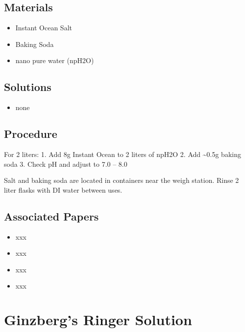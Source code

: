 \documentclass[
  letterpaper,
  DIV=11,
  numbers=noendperiod]{scrreprt}
\providecommand{\tightlist}{%
  \setlength{\itemsep}{0pt}\setlength{\parskip}{0pt}}\usepackage{longtable,booktabs,array}
\begin{document}
\hypertarget{materials-88}{%
\section{Materials}\label{materials-88}}

\begin{itemize}
\tightlist
\item
  Instant Ocean Salt
\item
  Baking Soda
\item
  nano pure water (npH2O)
\end{itemize}

\hypertarget{solutions-79}{%
\section{Solutions}\label{solutions-79}}

\begin{itemize}
\tightlist
\item
  none
\end{itemize}

\hypertarget{procedure-88}{%
\section{Procedure}\label{procedure-88}}

For 2 liters: 1. Add 8g Instant Ocean to 2 liters of npH2O 2. Add
\textasciitilde0.5g baking soda 3. Check pH and adjust to 7.0 -- 8.0

Salt and baking soda are located in containers near the weigh station.
Rinse 2 liter flasks with DI water between uses.

\hypertarget{associated-papers-62}{%
\section{Associated Papers}\label{associated-papers-62}}

\begin{itemize}
\tightlist
\item
  xxx
\item
  xxx
\item
  xxx
\item
  xxx
\end{itemize}

\hypertarget{sec-recipe-ginzbergs_ringers}{%
\chapter{Ginzberg's Ringer
Solution}\label{sec-recipe-ginzbergs_ringers}}
\end{document}
